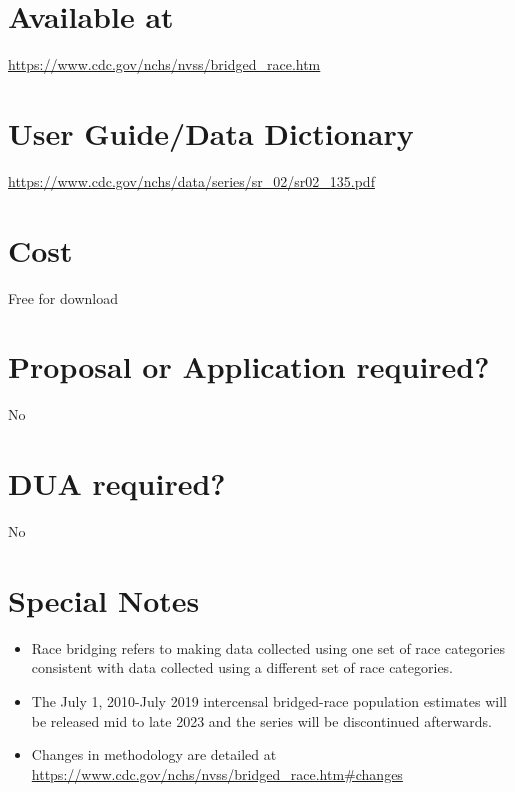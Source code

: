 \documentclass[
]{book}
\providecommand{\tightlist}{%
  \setlength{\itemsep}{0pt}\setlength{\parskip}{0pt}}
\begin{document}
\hypertarget{available-at-14}{%
\section{Available at}\label{available-at-14}}

\url{https://www.cdc.gov/nchs/nvss/bridged_race.htm}

\hypertarget{user-guidedata-dictionary-14}{%
\section{User Guide/Data Dictionary}\label{user-guidedata-dictionary-14}}

\url{https://www.cdc.gov/nchs/data/series/sr_02/sr02_135.pdf}

\hypertarget{cost-14}{%
\section{Cost}\label{cost-14}}

Free for download

\hypertarget{proposal-or-application-required-14}{%
\section{Proposal or Application required?}\label{proposal-or-application-required-14}}

No

\hypertarget{dua-required-14}{%
\section{DUA required?}\label{dua-required-14}}

No

\hypertarget{special-notes-14}{%
\section{Special Notes}\label{special-notes-14}}

\begin{itemize}
\tightlist
\item
  Race bridging refers to making data collected using one set of race categories consistent with data collected using a different set of race categories.
\item
  The July 1, 2010-July 2019 intercensal bridged-race population estimates will be released mid to late 2023 and the series will be discontinued afterwards.
\item
  Changes in methodology are detailed at \url{https://www.cdc.gov/nchs/nvss/bridged_race.htm\#changes}
\end{itemize}
\end{document}
